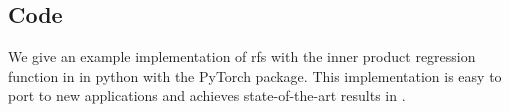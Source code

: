 \clearpage
\subsection{Code}
\label{sec:code}
We give an example implementation of \acrlong{rfs} with the inner product regression function in  in python with the PyTorch package. This implementation is easy to port to new applications and achieves state-of-the-art results in .
